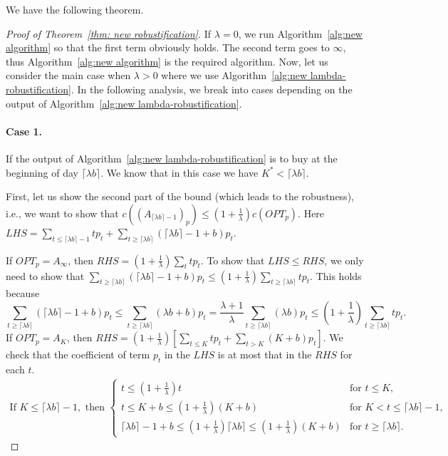 We have the following theorem.



\newrobust*


\begin{proof}[Proof of Theorem~\ref{thm: new robustification}]

If $\lambda=0$, we run Algorithm~\ref{alg:new algorithm} so that the first term obviously holds. The second term goes to $\infty$, thus Algorithm~\ref{alg:new algorithm} is the required algorithm. Now, let us consider the main case when $\lambda>0$ where we use Algorithm~\ref{alg:new lambda-robustification}.
In the following analysis, we break into cases depending on the output of Algorithm~\ref{alg:new lambda-robustification}. 

    \paragraph{Case 1.} If the output of Algorithm~\ref{alg:new lambda-robustification} is to buy at the beginning of day $\lceil \lambda b \rceil$. We know that in this case we have $K^* < \lceil \lambda b \rceil $. 

    First, let us show the second part of the bound (which leads to the robustness), i.e., we want to show that $c((A_{\lceil \lambda b \rceil - 1})_{p}) \leq (1+\frac{1}{\lambda})c(OPT_p)$. Here $LHS = \sum _{t \leq \lceil \lambda b \rceil - 1} tp_t + \sum_{t \geq \lceil \lambda b \rceil} (\lceil \lambda b \rceil - 1 + b)p_t$.
    
    If $OPT_p = A_\infty$, then $RHS=(1+\frac{1}{\lambda})\sum_t tp_t$. To show that $LHS \leq RHS$, we only need to show that $\sum_{t \geq \lceil \lambda b \rceil} (\lceil \lambda b \rceil - 1 + b)p_t  \leq (1+\frac{1}{\lambda})\sum_{t \geq \lceil \lambda b \rceil} tp_t$. This holds because
    \[\sum_{t \geq \lceil \lambda b \rceil} (\lceil \lambda b \rceil - 1 + b)p_t  \leq \sum_{t \geq \lceil \lambda b \rceil} (\lambda b + b)p_t = \frac{\lambda+1}{\lambda} \sum_{t \geq \lceil \lambda b \rceil} (\lambda b )p_t \leq (1+\frac{1}{\lambda})\sum_{t \geq \lceil \lambda b \rceil} tp_t.\]
    If $OPT_p = A_K$, then $RHS=(1+\frac{1}{\lambda}) \left[ \sum_{t \leq K}tp_t + \sum_{t>K}(K+b)p_t \right]$. We check that the coefficient of term $p_t$ in the $LHS$ is at most that in the $RHS$ for each $t$. 
    \begin{align*}
    \text{If } K \leq \lceil \lambda b \rceil - 1, \text{ then } 
    \begin{cases}
        t \leq (1+\frac{1}{\lambda})t & \text{for } t \leq K, \\
        t \leq K+b \leq (1+\frac{1}{\lambda})(K+b) & \text{for } K<t \leq \lceil \lambda b \rceil - 1, \\
        \lceil \lambda b \rceil - 1 +b \leq (1+\frac{1}{\lambda}) \lceil \lambda b \rceil \leq (1+\frac{1}{\lambda})(K+b) & \text{for } t \geq \lceil \lambda b \rceil.
    \end{cases}
    \end{align*}
    

\end{proof}
